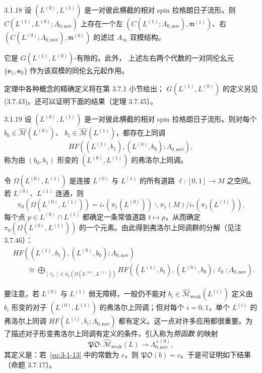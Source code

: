 \begin{theorem}{3.1.18}\label{thm:3-1-18}
设 $(L^{(0)},L^{(1)})$ 是一对彼此横截的相对 spin 拉格朗日子流形。则
$C(L^{(1)},L^{(0)};\Lambda_{0,\mathrm{nov}})$ 上存在一个左
$(C(L^{(1)};\Lambda_{0,\mathrm{nov}}),\mathfrak m^{(1)})$、右
$(C(L^{(0)};\Lambda_{0,\mathrm{nov}}),\mathfrak m^{(0)})$ 的滤过
$A_\infty$ 双模结构。

它是 $G(L^{(1)},L^{(0)})$-有隙的。此外，
上述左右两个代数的一对同伦幺元
$\{\mathbf e_1,\mathbf e_0\}$ 作为该双模的同伦幺元起作用。
\end{theorem}

定理中各种概念的精确定义将在第 3.7.1 小节给出；
$G(L^{(1)},L^{(0)})$ 的定义另见 (3.7.43)。还可以证明下面的结果（定理 3.7.45）。

\begin{theorem}{3.1.19}\label{thm:3-1-19}
设 $(L^{(0)},L^{(1)})$ 是一对彼此横截的相对 spin 拉格朗日子流形。则对每个
$b_0\in\widehat{\mathcal M}(L^{(0)})$、
$b_1\in\widehat{\mathcal M}(L^{(1)})$，都存在上同调
\[
  HF((L^{(1)},b_1),(L^{(0)},b_0);\Lambda_{0,\mathrm{nov}}),
\]
称为由 $(b_0,b_1)$ 形变的 $(L^{(0)},L^{(1)})$ 的弗洛尔上同调。
\end{theorem}

令 $\Omega(L^{(0)},L^{(1)})$ 是连接 $L^{(0)}$ 与 $L^{(1)}$ 的所有道路
$\ell\colon[0,1]\to M$ 之空间。若 $L^{(0)}$、$L^{(1)}$ 连通，则
\[
  \pi_0(\Omega(L^{(0)},L^{(1)}))
  =i_*(\pi_1(L^{(0)}))\backslash\pi_1(M)
  /i_*(\pi_1(L^{(1)})).
\]
每个点 $p\in L^{(0)}\cap L^{(1)}$ 都确定一条常值道路
$t\mapsto p$，从而确定 $\pi_0(\Omega(L^{(0)},L^{(1)}))$ 的一个元素。由此得到弗洛尔上同调群的分解（见注 3.7.46）：
\begin{equation}
\begin{split}
  &HF((L^{(1)},b_1),(L^{(0)},b_0);\Lambda_{0,\mathrm{nov}})\\
  &\qquad\cong
  \bigoplus_{[\ell_0]\in\pi_0(\Omega(L^{(0)},L^{(1)}))}
  HF((L^{(1)},b_1),(L^{(0)},b_0);\ell_0;\Lambda_{0,\mathrm{nov}}).
\end{split}
  \tag{3.1.20}\label{eq:3-1-20}
\end{equation}

要注意，若 $L^{(0)}$ 与 $L^{(1)}$ 弱无障碍，一般仍不能对
$b_i\in\widehat{\mathcal M}_{\mathrm{weak}}(L^{(i)})$ 定义由 $b_i$ 形变的对子
$(L^{(0)},L^{(1)})$ 的弗洛尔上同调；但对每个 $i=0,1$，单个
$L^{(i)}$ 的弗洛尔上同调
$HF(L^{(i)},b_i;\Lambda_{0,\mathrm{nov}})$ 都有定义。这一点对许多应用都很重要。为了描述对子形变弗洛尔上同调有定义的条件，引入称为\emph{势函数}
的映射
\[
  \mathfrak{PO}\colon
  \widehat{\mathcal M}_{\mathrm{weak}}(L)
  \longrightarrow\Lambda_{0,\mathrm{nov}}^{+(0)},
\]
其定义是：若~\eqref{eq:3-1-13} 中的常数为 $c$，则
$\mathfrak{PO}(b)=c$。于是可证明如下结果（命题 3.7.17）。

